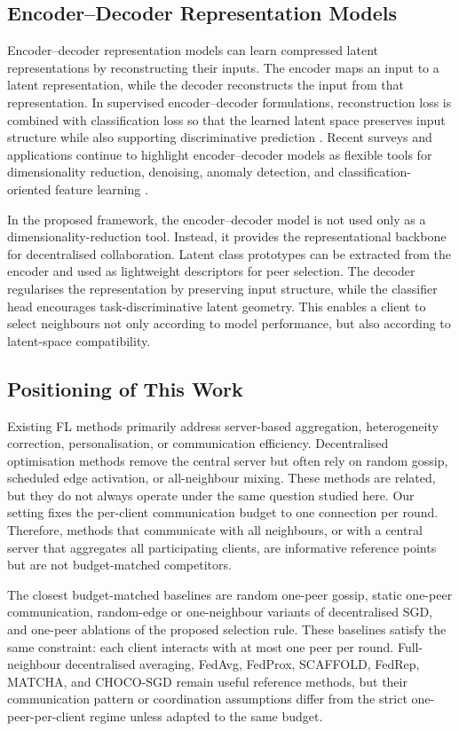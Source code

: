 \documentclass[conference]{IEEEtran}
\begin{document}
\subsection{Encoder--Decoder Representation Models}
\label{subsec:encoder-decoder-representation-models}
Encoder--decoder representation models can learn compressed latent representations by reconstructing their inputs. The encoder maps an input to a latent representation, while the decoder reconstructs the input from that representation. In supervised encoder--decoder formulations, reconstruction loss is combined with classification loss so that the learned latent space preserves input structure while also supporting discriminative prediction \cite{le2018supervised}. Recent surveys and applications continue to highlight encoder--decoder models as flexible tools for dimensionality reduction, denoising, anomaly detection, and classification-oriented feature learning \cite{chen2023auto,gille2022semi}.

In the proposed framework, the encoder--decoder model is not used only as a dimensionality-reduction tool. Instead, it provides the representational backbone for decentralised collaboration. Latent class prototypes can be extracted from the encoder and used as lightweight descriptors for peer selection. The decoder regularises the representation by preserving input structure, while the classifier head encourages task-discriminative latent geometry. This enables a client to select neighbours not only according to model performance, but also according to latent-space compatibility.

\subsection{Positioning of This Work}
\label{subsec:positioning-of-this-work}
Existing FL methods primarily address server-based aggregation, heterogeneity correction, personalisation, or communication efficiency. Decentralised optimisation methods remove the central server but often rely on random gossip, scheduled edge activation, or all-neighbour mixing. These methods are related, but they do not always operate under the same question studied here. Our setting fixes the per-client communication budget to one connection per round. Therefore, methods that communicate with all neighbours, or with a central server that aggregates all participating clients, are informative reference points but are not budget-matched competitors.

The closest budget-matched baselines are random one-peer gossip, static one-peer communication, random-edge or one-neighbour variants of decentralised SGD, and one-peer ablations of the proposed selection rule. These baselines satisfy the same constraint: each client interacts with at most one peer per round. Full-neighbour decentralised averaging, FedAvg, FedProx, SCAFFOLD, FedRep, MATCHA, and CHOCO-SGD remain useful reference methods, but their communication pattern or coordination assumptions differ from the strict one-peer-per-client regime unless adapted to the same budget.
\end{document}
